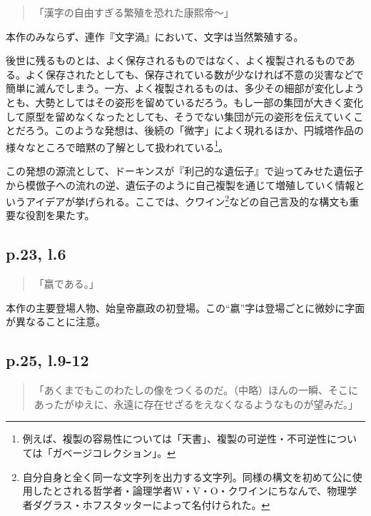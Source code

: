 \documentclass[10pt, a5paper, twoside]{jsarticle}
\theoremstyle{definition}
\begin{document}
		\begin{quote}

			「漢字の自由すぎる繁殖を恐れた康熙帝〜」

		\end{quote}

		本作のみならず、連作『文字渦』において、文字は当然繁殖する。

		後世に残るものとは、よく保存されるものではなく、よく複製されるものである。よく保存されたとしても、保存されている数が少なければ不意の災害などで簡単に滅んでしまう。一方、よく複製されるものは、多少その細部が変化しようとも、大勢としてはその姿形を留めているだろう。もし一部の集団が大きく変化して原型を留めなくなったとしても、そうでない集団が元の姿形を伝えていくことだろう。このような発想は、後続の「微字」によく現れるほか、円城塔作品の様々なところで暗黙の了解として扱われている\footnote{例えば、複製の容易性については「天書」、複製の可逆性・不可逆性については「ガベージコレクション」。}。

		この発想の源流として、ドーキンスが『利己的な遺伝子』で辿ってみせた遺伝子から模倣子への流れの逆、遺伝子のように自己複製を通じて増殖していく情報というアイデアが挙げられる。ここでは、クワイン\footnote{自分自身と全く同一な文字列を出力する文字列。同様の構文を初めて公に使用したとされる哲学者・論理学者W・V・O・クワインにちなんで、物理学者ダグラス・ホフスタッターによって名付けられた\cite{geb}。}などの自己言及的な構文も重要な役割を果たす。

		\subsection{p.23, l.6}

		\begin{quote}

			「嬴である。」

		\end{quote}

		本作の主要登場人物、始皇帝嬴政の初登場。この“嬴”字は登場ごとに微妙に字面が異なることに注意。

		\subsection{p.25, l.9-12}

		\begin{quote}

			「あくまでもこのわたしの像をつくるのだ。（中略）ほんの一瞬、そこにあったがゆえに、永遠に存在せざるをえなくなるようなものが望みだ。」

		\end{quote}
\end{document}
